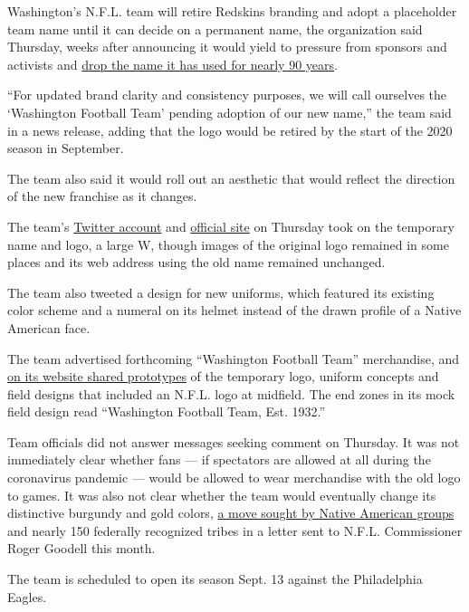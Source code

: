 Washington's N.F.L. team will retire Redskins branding and adopt a
placeholder team name until it can decide on a permanent name, the
organization said Thursday, weeks after announcing it would yield to
pressure from sponsors and activists and
\href{https://www.nytimes.com/2020/07/13/sports/football/washington-redskins-new-name.html}{drop
the name it has used for nearly 90 years}.

``For updated brand clarity and consistency purposes, we will call
ourselves the `Washington Football Team' pending adoption of our new
name,'' the team said in a news release, adding that the logo would be
retired by the start of the 2020 season in September.

The team also said it would roll out an aesthetic that would reflect the
direction of the new franchise as it changes.

The team's \href{https://twitter.com/WashingtonNFL}{Twitter account} and
\href{https://www.redskins.com/}{official site} on Thursday took on the
temporary name and logo, a large W, though images of the original logo
remained in some places and its web address using the old name remained
unchanged.

The team also tweeted a design for new uniforms, which featured its
existing color scheme and a numeral on its helmet instead of the drawn
profile of a Native American face.

The team advertised forthcoming ``Washington Football Team''
merchandise, and
\href{https://www.redskins.com/team/washingtonfootball}{on its website
shared prototypes} of the temporary logo, uniform concepts and field
designs that included an N.F.L. logo at midfield. The end zones in its
mock field design read ``Washington Football Team, Est. 1932.''

Team officials did not answer messages seeking comment on Thursday. It
was not immediately clear whether fans --- if spectators are allowed at
all during the coronavirus pandemic --- would be allowed to wear
merchandise with the old logo to games. It was also not clear whether
the team would eventually change its distinctive burgundy and gold
colors,
\href{https://www.nytimes.com/2020/07/13/sports/football/native-american-washington-name-change.html}{a
move sought by Native American groups} and nearly 150 federally
recognized tribes in a letter sent to N.F.L. Commissioner Roger Goodell
this month.

The team is scheduled to open its season Sept. 13 against the
Philadelphia Eagles.

